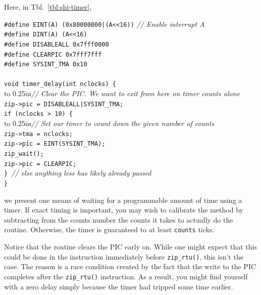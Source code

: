 \documentclass{gqtekspec}
\begin{document}
Here, in Tbl.~\ref{tbl:shi-timer},
\begin{table}\begin{center}
\begin{tabbing}
{\tt \#define EINT(A) (0x80000000|(A<<16))} \= {\em // Enable interrupt A}\\
{\tt \#define DINT(A) (A<<16)} \\
{\tt \#define DISABLEALL 0x7fff0000} \\
{\tt \#define CLEARPIC 0x7fff7fff} \\
{\tt \#define SYSINT\_TMA 0x10} \\
\\
{\tt void timer\_delay(int nclocks) \{} \\
\hbox to 0.25in{}\= {\em // Clear the PIC.  We want to exit from here on timer counts alone}\\
	\> {\tt zip->pic = DISABLEALL|SYSINT\_TMA;}\\
	\> {\tt if (nclocks > 10) \{}\\
	\> \hbox to 0.25in{}\= {\em // Set our timer to count down the given number of counts}\\
	\> \> {\tt zip->tma = nclocks;} \\
	\> \> {\tt zip->pic = EINT(SYSINT\_TMA);} \\
	\> \> {\tt zip\_wait();} \\
	\> \> {\tt zip->pic = CLEARPIC;} \\
	\> {\tt \} }{\em // else anything less has likely already passed} \\
{\tt \}}\\
\end{tabbing}
\caption{Waiting on a timer}\label{tbl:shi-timer}
\end{center}\end{table}
we present one means of waiting for a programmable amount of time using a
timer.  If exact timing is important, you may wish to calibrate the method
by subtracting from the counts number the counts it takes to actually do the
routine.  Otherwise, the timer is guaranteed to at least {\tt counts}
ticks.

Notice that the routine clears the PIC early on.  While one might expect
that this could be done in the instruction immediately before {\tt zip\_rtu()},
this isn't the case.  The reason is a race condition created by the fact that
the write to the PIC completes after the {\tt zip\_rtu()} instruction.  As a
result, you might find yourself with a zero delay simply because the timer
had tripped some time earlier.
\end{document}
